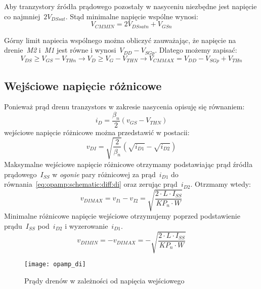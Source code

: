 \documentclass[twoside,pl,final]{labman}
\begin{document}
Aby tranzystory źródła prądowego pozostały w nasyceniu niezbędne jest napięcie co najmniej~$2V_{DSsat}$.
Stąd minimalne napięcie wspólne wynosi:
\begin{equation}
  V_{CMMIN} = 2V_{DSsatn} + V_{GSn}
\end{equation}

Górny limit napiecia wspólnego można obliczyć zauważając,
że napięcie na drenie~\emph{M2} i~\emph{M1} jest równe i wynosi~$V_{DD} - V_{SGp}$.
Dlatego możemy zapisać:
\begin{equation}
  V_{DS} \geq V_{GS} - V_{THn} \rightarrow V_D \geq V_G - V_{THN} \rightarrow V_{CMMAX} = V_{DD} - V_{SGp} + V_{THn}
\end{equation}

\subsection{Wejściowe napięcie różnicowe}
\label{opamp:schematic:diff}
Ponieważ prąd drenu tranzystors w zakresie nasycenia opisuję się równaniem:
\begin{equation}
  i_D = \frac{\beta_n}{2}(v_{GS} - V_{THN})
\end{equation}
wejściowe napięcie różnicowe można przedstawić w postacii:
\begin{equation}
  v_{DI} = \sqrt{\frac{2}{\beta_n}}(\sqrt{i_{D1}} - \sqrt{i_{D2}})
  \label{eq:opamp:schematic:diff:di}
\end{equation}
Maksymalne wejściowe napięcie różnicowe otrzymamy podstawiając prąd źródła prądowego~$I_{SS}$ w \emph{ogonie} pary różnicowej
za prąd~$i_{D1}$ do równania~\ref{eq:opamp:schematic:diff:di} oraz zerując prąd~$i_{D2}$.
Otrzmamy wtedy:
\begin{equation}
  v_{DIMAX} = v_{I1} - v_{I2} = \sqrt{\frac{2 \cdot L \cdot I_{SS}}{KP_n \cdot W}}
  \label{eq:opamp:schematic:diff:di:max}
\end{equation}
Minimalne różnicowe napięcie wejściowe otrzymujemy poprzed podstawienie prądu~$I_{SS}$ pod~$i_{D2}$ i wyzerowanie~$i_{D1}$.
\begin{equation}
  v_{DIMIN} = - v_{DIMAX} = - \sqrt{\frac{2 \cdot L \cdot I_{SS}}{KP_n \cdot W}}
\end{equation}

\begin{figure}[!htbp]
  \centering
  \texttt{[image: opamp\_di]}
  \caption{Prądy drenów w zależności od napięcia wejściowego}
  \label{fig:opamp:schematic:diff:di}
\end{figure}
\end{document}
